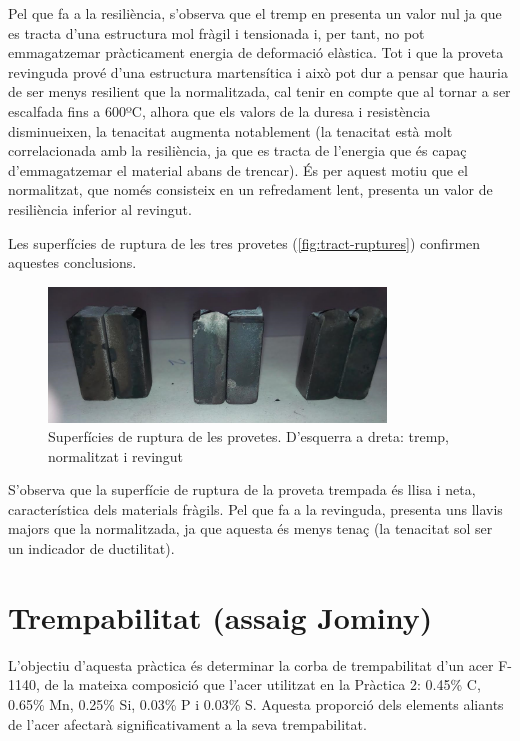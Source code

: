 \documentclass[a4paper]{report}
\begin{document}
Pel que fa a la resiliència, s'observa que el tremp en presenta un valor nul ja que es tracta d'una estructura mol fràgil i tensionada i, per tant, no pot emmagatzemar pràcticament energia de deformació elàstica. Tot i que la proveta revinguda prové d'una estructura martensítica i això pot dur a pensar que hauria de ser menys resilient que la normalitzada, cal tenir en compte que al tornar a ser escalfada fins a 600ºC, alhora que els valors de la duresa i resistència disminueixen, la tenacitat augmenta notablement (la tenacitat està molt correlacionada amb la resiliència, ja que es tracta de l'energia que és capaç d'emmagatzemar el material abans de trencar). És per aquest motiu que el normalitzat, que només consisteix en un refredament lent, presenta un valor de resiliència inferior al revingut.

Les superfícies de ruptura de les tres provetes (\autoref{fig:tract-ruptures}) confirmen aquestes conclusions.

\begin{figure}[H]
	\centering
	\includegraphics[width=0.8\textwidth]{images/tractaments/ruptures}
	\caption{Superfícies de ruptura de les provetes. D'esquerra a dreta: tremp, normalitzat i revingut}
	\label{fig:tract-ruptures}
\end{figure}

S'observa que la superfície de ruptura de la proveta trempada és llisa i neta, característica dels materials fràgils. Pel que fa a la revinguda, presenta uns llavis majors que la normalitzada, ja que aquesta és menys tenaç (la tenacitat sol ser un indicador de ductilitat).

\chapter{Trempabilitat (assaig Jominy)}
L'objectiu d'aquesta pràctica és determinar la corba de trempabilitat d'un acer F-1140, de la mateixa composició que l'acer utilitzat en la Pràctica 2: 0.45\% C, 0.65\% Mn, 0.25\% Si, 0.03\% P i 0.03\% S. Aquesta proporció dels elements aliants de l'acer afectarà significativament a la seva trempabilitat.
\end{document}
